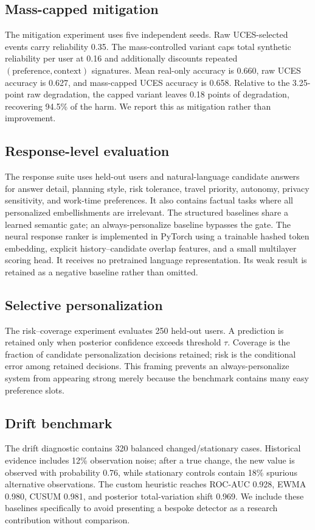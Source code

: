 \documentclass[10pt,twocolumn]{article}
\begin{document}
\subsection{Mass-capped mitigation}
The mitigation experiment uses five independent seeds. Raw UCES-selected events carry reliability 0.35. The mass-controlled variant caps total synthetic reliability per user at 0.16 and additionally discounts repeated $(\text{preference},\text{context})$ signatures. Mean real-only accuracy is 0.660, raw UCES accuracy is 0.627, and mass-capped UCES accuracy is 0.658. Relative to the 3.25-point raw degradation, the capped variant leaves 0.18 points of degradation, recovering 94.5\% of the harm. We report this as mitigation rather than improvement.

\subsection{Response-level evaluation}
The response suite uses held-out users and natural-language candidate answers for answer detail, planning style, risk tolerance, travel priority, autonomy, privacy sensitivity, and work-time preferences. It also contains factual tasks where all personalized embellishments are irrelevant. The structured baselines share a learned semantic gate; an always-personalize baseline bypasses the gate. The neural response ranker is implemented in PyTorch using a trainable hashed token embedding, explicit history--candidate overlap features, and a small multilayer scoring head. It receives no pretrained language representation. Its weak result is retained as a negative baseline rather than omitted.

\subsection{Selective personalization}
The risk--coverage experiment evaluates 250 held-out users. A prediction is retained only when posterior confidence exceeds threshold $\tau$. Coverage is the fraction of candidate personalization decisions retained; risk is the conditional error among retained decisions. This framing prevents an always-personalize system from appearing strong merely because the benchmark contains many easy preference slots.

\subsection{Drift benchmark}
The drift diagnostic contains 320 balanced changed/stationary cases. Historical evidence includes 12\% observation noise; after a true change, the new value is observed with probability 0.76, while stationary controls contain 18\% spurious alternative observations. The custom heuristic reaches ROC-AUC 0.928, EWMA 0.980, CUSUM 0.981, and posterior total-variation shift 0.969. We include these baselines specifically to avoid presenting a bespoke detector as a research contribution without comparison.
\end{document}
